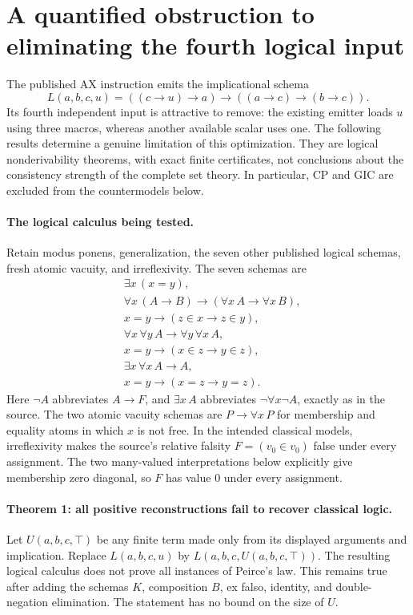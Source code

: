 \section{A quantified obstruction to eliminating the fourth logical input}
\label{sec:fourth-input-obstruction}

The published AX instruction emits the implicational schema
\[
 L(a,b,c,u)=((c\to u)\to a)\to((a\to c)\to(b\to c)).
\]
Its fourth independent input is attractive to remove: the existing emitter
loads $u$ using three macros, whereas another available scalar uses one.
The following results determine a genuine limitation of this optimization.
They are logical nonderivability theorems, with exact finite certificates,
not conclusions about the consistency strength of the complete set theory.
In particular, CP and GIC are excluded from the countermodels below.

\paragraph{The logical calculus being tested.}
Retain modus ponens, generalization, the seven other published logical
schemas, fresh atomic vacuity, and irreflexivity. The seven schemas are
\begin{align*}
 &\exists x\,(x=y),\\
 &\forall x\,(A\to B)\to(\forall x\,A\to\forall x\,B),\\
 &x=y\to(z\in x\to z\in y),\\
 &\forall x\,\forall y\,A\to\forall y\,\forall x\,A,\\
 &x=y\to(x\in z\to y\in z),\\
 &\exists x\,\forall x\,A\to A,\\
 &x=y\to(x=z\to y=z).
\end{align*}
Here $\neg A$ abbreviates $A\to F$, and
$\exists x\,A$ abbreviates $\neg\forall x\neg A$, exactly as in the source.
The two atomic vacuity schemas are $P\to\forall x\,P$ for membership and
equality atoms in which $x$ is not free. In the intended classical models,
irreflexivity makes the source's relative falsity $F=(v_0\in v_0)$ false
under every assignment. The two many-valued interpretations below explicitly
give membership zero diagonal, so $F$ has value $0$ under every assignment.

\paragraph{Theorem 1: all positive reconstructions fail to recover classical logic.}
Let $U(a,b,c,\top)$ be any finite term made only from its displayed
arguments and implication. Replace $L(a,b,c,u)$ by
$L(a,b,c,U(a,b,c,\top))$. The resulting logical calculus does not prove
all instances of Peirce's law. This remains true after adding the schemas
$K$, composition $B$, ex falso, identity, and double-negation elimination.
The statement has no bound on the size of $U$.

